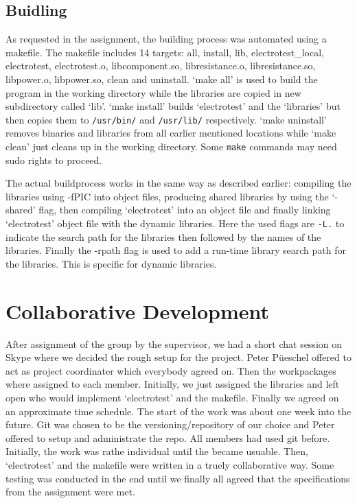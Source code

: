 \documentclass[a4paper,11pt,twoside]{article}
\begin{document}
\subsection{Buidling}
As requested in the assignment, the building process was automated using a makefile. The makefile includes 14 targets: all, install, lib, electrotest\_local, electrotest, electrotest.o, libcomponent.so, libresistance.o, libresistance.so, libpower.o, libpower.so, clean and uninstall. `make all' is used to build the program in the working directory while the libraries are copied in new subdirectory called `lib'. `make install' builds `electrotest' and the `libraries' but then copies them to \verb+/usr/bin/+ and \verb+/usr/lib/+ respectively. `make uninstall' removes binaries and libraries from all earlier mentioned locations while `make clean' just cleans up in the working directory. Some \verb+make+ commands may need sudo rights to proceed.

The actual buildprocess works in the same way as described earlier: compiling the libraries using -fPIC into object files, producing shared libraries by using the `-shared' flag, then compiling `electrotest' into an object file and finally linking `electrotest' object file with the dynamic libraries. Here the used flags are \verb+-L.+ to indicate the search path for the libraries then followed by the names of the libraries. Finally the -rpath flag is used to add a run-time library search path for the libraries. This is specific for dynamic libraries.  

 
\section{Collaborative Development}
After assignment of the group by the supervisor, we had a short chat session on Skype where we decided the rough setup for the project. Peter Püeschel offered to act as project coordinater which everybody agreed on. Then the workpackages where assigned to each member. Initially, we just assigned the libraries and left open who would implement `electrotest' and the makefile. Finally we agreed on an approximate time schedule. The start of the work was about one week into the future. Git was chosen to be the versioning/repository of our choice and Peter offered to setup and administrate the repo. All members had used git before.
Initially, the work was rathe individual until the became usuable. Then, `electrotest' and the makefile were written in a truely collaborative way. Some testing was conducted in the end until we finally all agreed that the specifications from the assignment were met. 
\end{document}
